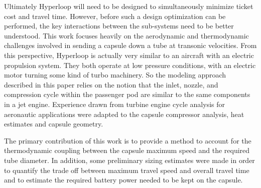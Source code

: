 \documentclass[heading.tex]{subfiles}
\begin{document}
Ultimately Hyperloop will need to be designed to simultaneously minimize ticket cost and travel time. However, before such a design optimization can be performed, the key interactions between the sub-systems need to be better understood. This work focuses heavily on the 
aerodynamic and thermodynamic challenges involved in sending a capsule down a tube at transonic velocities. From this perspective, Hyperloop 
is actually very similar to an aircraft with an electric propulsion system. They both operate at low pressure conditions, with an electric motor turning some kind of turbo machinery. So the modeling approach described in this paper relies on the notion that the inlet, nozzle, and compression cycle within the passenger pod are similar to the same components in a jet engine. Experience drawn from turbine engine cycle analysis for aeronautic applications were adapted to the capsule compressor analysis, heat estimates and capsule geometry.

The primary contribution of this work is to provide a method to account for the thermodynamic coupling between the capsule maximum speed and the required tube diameter. In addition, some preliminary sizing estimates were made in order to quantify the trade off between maximum travel speed and overall travel time and to estimate the required battery power needed to be kept on the capsule. 


\end{document}
